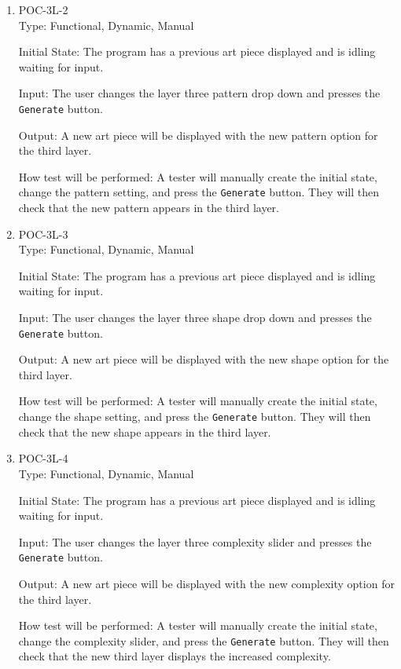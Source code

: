 \documentclass[12pt, titlepage]{article}
\begin{document}
\begin{enumerate}
\setcounter{enumi}{\theenumTemp}

\item{POC-3L-2}\\
Type: Functional, Dynamic, Manual

Initial State: The program has a previous art piece displayed and is idling waiting for input.

Input: The user changes the layer three pattern drop down and presses the \texttt{Generate} button.

Output: A new art piece will be displayed with the new pattern option for the third layer.

How test will be performed: A tester will manually create the initial state, change the pattern setting, and press the \texttt{Generate} button. They will then check that the new pattern appears in the third layer.

\item{POC-3L-3}\\
Type: Functional, Dynamic, Manual

Initial State: The program has a previous art piece displayed and is idling waiting for input.

Input: The user changes the layer three shape drop down and presses the \texttt{Generate} button.

Output: A new art piece will be displayed with the new shape option for the third layer.

How test will be performed: A tester will manually create the initial state, change the shape setting, and press the \texttt{Generate} button. They will then check that the new shape appears in the third layer.

\item{POC-3L-4}\\
Type: Functional, Dynamic, Manual

Initial State: The program has a previous art piece displayed and is idling waiting for input.

Input: The user changes the layer three complexity slider and presses the \texttt{Generate} button.

Output: A new art piece will be displayed with the new complexity option for the third layer.

How test will be performed: A tester will manually create the initial state, change the complexity slider, and press the \texttt{Generate} button. They will then check that the new third layer displays the increased complexity.


\end{enumerate}
\end{document}
